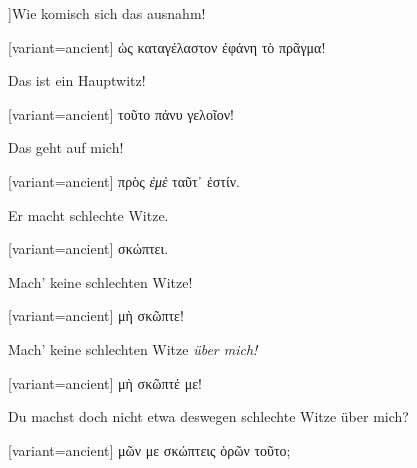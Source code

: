 ]Wie komisch sich das aus\textcompwordmark{}nahm! 

\switchcolumn

\begin{greek}[variant=ancient]%
ὡς καταγέλαστον ἐφάνη τὸ πρᾶγμα!

\end{greek}%
\switchcolumn*

Das ist ein Hauptwitz! 

\switchcolumn

\begin{greek}[variant=ancient]%
τοῦτο πάνυ γελοῖον!

\end{greek}%
\switchcolumn*

Das geht auf mich! 

\switchcolumn

\begin{greek}[variant=ancient]%
πρὸς \emph{ἐμὲ} ταῦτ᾽ ἐστίν.

\end{greek}%
\switchcolumn*

Er macht schlechte Witze. 

\switchcolumn

\begin{greek}[variant=ancient]%
σκώπτει.

\end{greek}%
\switchcolumn*

Mach' keine schlechten Witze! 

\switchcolumn

\begin{greek}[variant=ancient]%
μὴ σκῶπτε!

\end{greek}%
\switchcolumn*

Mach' keine schlechten Witze \emph{über mich!}

\switchcolumn

\begin{greek}[variant=ancient]%
μὴ σκῶπτέ με!

\end{greek}%
\switchcolumn*

Du machst doch nicht etwa des\textcompwordmark{}wegen schlechte Witze
über mich? 

\switchcolumn

\begin{greek}[variant=ancient]%
μῶν με σκώπτεις ὁρῶν τοῦτο;

\end{greek}%
\switchcolumn*

